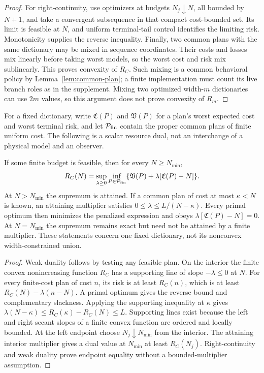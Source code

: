 \begin{proof}
For right-continuity, use optimizers at budgets $N_j\downarrow N$, all bounded by $N+1$, and take a convergent subsequence in that compact cost-bounded set. Its limit is feasible at $N$, and uniform terminal-tail control identifies the limiting risk. Monotonicity supplies the reverse inequality. Finally, two common plans with the same dictionary may be mixed in sequence coordinates. Their costs and losses mix linearly before taking worst models, so the worst cost and risk mix sublinearly. This proves convexity of $R_C$. Such mixing is a common behavioral policy by Lemma~\ref{lem:common-plan}; a finite implementation must count its live branch roles as in the supplement. Mixing two optimized width-$m$ dictionaries can use $2m$ values, so this argument does not prove convexity of $R_m$.
\end{proof}

For a fixed dictionary, write $\mathfrak C(P)$ and $\mathfrak V(P)$ for a plan's worst expected cost and worst terminal risk, and let $\mathcal P_{\rm fin}$ contain the proper common plans of finite uniform cost. The following is a scalar resource dual, not an interchange of a physical model and an observer.
\begin{corollary}\label{cor:resource-price}
If some finite budget is feasible, then for every $N\ge N_{\min}$,
\begin{equation}\label{eq:resource-price}
 R_C(N)=\sup_{\lambda\ge0}\inf_{P\in\mathcal P_{\rm fin}}
       \{\mathfrak V(P)+\lambda[\mathfrak C(P)-N]\}.
\end{equation}
At $N>N_{\min}$ the supremum is attained. If a common plan of cost at most $\kappa<N$ is known, an attaining multiplier satisfies $0\le\lambda\le L/(N-\kappa)$. Every primal optimum then minimizes the penalized expression and obeys
$\lambda[\mathfrak C(P)-N]=0$. At $N=N_{\min}$ the supremum remains exact but need not be attained by a finite multiplier. These statements concern one fixed dictionary, not its nonconvex width-constrained union.
\end{corollary}
\begin{proof}
Weak duality follows by testing any feasible plan. On the interior the finite convex nonincreasing function $R_C$ has a supporting line of slope $-\lambda\le0$ at $N$. For every finite-cost plan of cost $n$, its risk is at least $R_C(n)$, which is at least $R_C(N)-\lambda(n-N)$. A primal optimum gives the reverse bound and complementary slackness. Applying the supporting inequality at $\kappa$ gives $\lambda(N-\kappa)\le R_C(\kappa)-R_C(N)\le L$. Supporting lines exist because the left and right secant slopes of a finite convex function are ordered and locally bounded. At the left endpoint choose $N_j\downarrow N_{\min}$ from the interior. The attaining interior multiplier gives a dual value at $N_{\min}$ at least $R_C(N_j)$. Right-continuity and weak duality prove endpoint equality without a bounded-multiplier assumption.
\end{proof}


